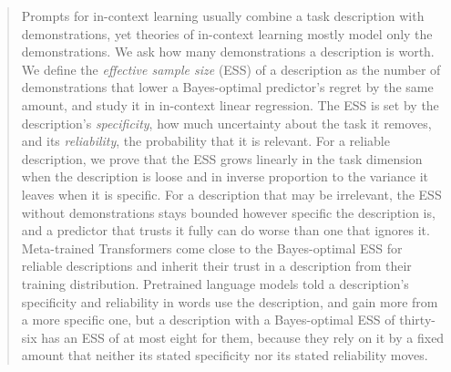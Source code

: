 \documentclass{article}
\begin{document}
\printAffiliationsAndNotice{}

\begin{abstract}
Prompts for in-context learning usually combine a task description with demonstrations, yet theories of in-context learning mostly model only the demonstrations. We ask how many demonstrations a description is worth. We define the \emph{effective sample size} (ESS) of a description as the number of demonstrations that lower a Bayes-optimal predictor's regret by the same amount, and study it in in-context linear regression. The ESS is set by the description's \emph{specificity}, how much uncertainty about the task it removes, and its \emph{reliability}, the probability that it is relevant. For a reliable description, we prove that the ESS grows linearly in the task dimension when the description is loose and in inverse proportion to the variance it leaves when it is specific. For a description that may be irrelevant, the ESS without demonstrations stays bounded however specific the description is, and a predictor that trusts it fully can do worse than one that ignores it. Meta-trained Transformers come close to the Bayes-optimal ESS for reliable descriptions and inherit their trust in a description from their training distribution. Pretrained language models told a description's specificity and reliability in words use the description, and gain more from a more specific one, but a description with a Bayes-optimal ESS of thirty-six has an ESS of at most eight for them, because they rely on it by a fixed amount that neither its stated specificity nor its stated reliability moves.
\end{abstract}
\end{document}
